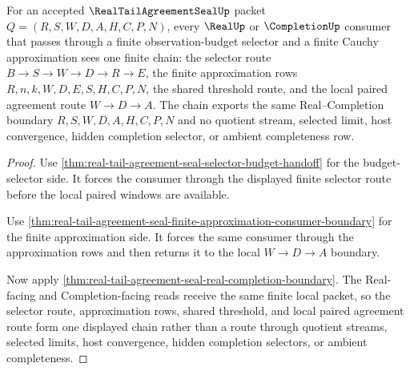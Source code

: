 \begin{theorem}
\label{thm:real-tail-agreement-seal-real-completion-selector-chain}
For an accepted $\RealTailAgreementSealUp$ packet $Q=(R,S,W,D,A,H,C,P,N)$, every $\RealUp$ or $\CompletionUp$ consumer that passes through a finite observation-budget selector and a finite Cauchy approximation sees one finite chain: the selector route $B \to S \to W \to D \to R \to E$, the finite approximation rows $R,n,k,W,D,E,S,H,C,P,N$, the shared threshold route, and the local paired agreement route $W \to D \to A$. The chain exports the same Real--Completion boundary $R,S,W,D,A,H,C,P,N$ and no quotient stream, selected limit, host convergence, hidden completion selector, or ambient completeness row.
\end{theorem}
\begin{proof}
Use \autoref{thm:real-tail-agreement-seal-selector-budget-handoff} for the budget-selector side. It forces the consumer through the displayed finite selector route before the local paired windows are available.

Use \autoref{thm:real-tail-agreement-seal-finite-approximation-consumer-boundary} for the finite approximation side. It forces the same consumer through the approximation rows and then returns it to the local $W \to D \to A$ boundary.

Now apply \autoref{thm:real-tail-agreement-seal-real-completion-boundary}. The Real-facing and Completion-facing reads receive the same finite local packet, so the selector route, approximation rows, shared threshold, and local paired agreement route form one displayed chain rather than a route through quotient streams, selected limits, host convergence, hidden completion selectors, or ambient completeness.
\end{proof}



